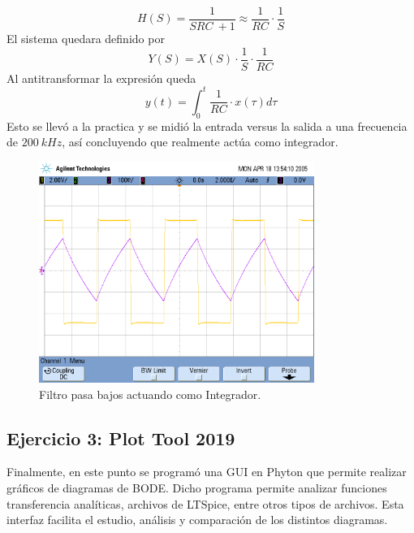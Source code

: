 \documentclass[a4paper]{article}
\begin{document}
\begin{equation}
	H \left(S \right) = \frac{1}{SRC \ + 1} \approx \frac{1}{RC} \cdot \frac{1}{S}
\end{equation}
El sistema quedara definido por 
\begin{equation}
	Y \left(S \right) = X \left(S \right) \cdot \frac{1}{S} \cdot \frac{1}{RC}
\end{equation}
Al antitransformar la expresión queda 
\begin{equation}
	y \left(t \right)=\int_{0}^{t} \frac{1}{RC}\cdot x(\tau) d\tau
\end{equation}
Esto se llevó a la practica y se midió la entrada versus la salida a una frecuencia  de $200 \ kHz$, así concluyendo que realmente actúa como integrador.
\begin{figure}[H]
	\centering
	\includegraphics[width=0.8\textwidth,trim={0.7cm 6.25cm  0 3.5cm},clip]{Integrando.png}
\caption{Filtro pasa bajos actuando como Integrador.}
	\label{fig:integrand}
\end{figure}
\subsection{Ejercicio 3: Plot Tool 2019}
Finalmente, en este punto se programó una GUI en Phyton que permite realizar gráficos de diagramas de BODE. Dicho programa permite analizar funciones transferencia analíticas, archivos de LTSpice, entre otros tipos de archivos. Esta interfaz facilita el estudio, análisis y comparación de los distintos diagramas.
\end{document}
